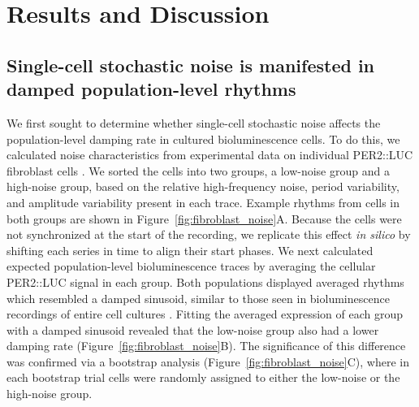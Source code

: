 \documentclass[11pt, letterpaper]{article}
\begin{document}
\section*{Results and Discussion}

\subsection*{Single-cell stochastic noise is manifested in damped population-level rhythms}

We first sought to determine whether single-cell stochastic noise affects the population-level damping rate in cultured bioluminescence cells.
To do this, we calculated noise characteristics from experimental data on individual PER2::LUC fibroblast cells \cite{Leise2012}.
We sorted the cells into two groups, a low-noise group and a high-noise group, based on the relative high-frequency noise, period variability, and amplitude variability present in each trace.
Example rhythms from cells in both groups are shown in Figure~\ref{fig:fibroblast_noise}A.
Because the cells were not synchronized at the start of the recording, we replicate this effect {\itshape in silico} by shifting each series in time to align their start phases.
We next calculated expected population-level bioluminescence traces by averaging the cellular PER2::LUC signal in each group.
Both populations displayed averaged rhythms which resembled a damped sinusoid, similar to those seen in bioluminescence recordings of entire cell cultures .
Fitting the averaged expression of each group with a damped sinusoid revealed that the low-noise group also had a lower damping rate (Figure~\ref{fig:fibroblast_noise}B).
The significance of this difference was confirmed via a bootstrap analysis (Figure~\ref{fig:fibroblast_noise}C), where in each bootstrap trial cells were randomly assigned to either the low-noise or the high-noise group.
\end{document}
